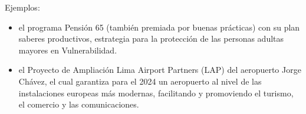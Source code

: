 \documentclass[
  a4paper,
]{article}
\providecommand{\tightlist}{%
  \setlength{\itemsep}{0pt}\setlength{\parskip}{0pt}}\usepackage{longtable,booktabs,array}
\begin{document}
Ejemplos:

\begin{itemize}
\tightlist
\item
  el programa Pensión 65 (también premiada por buenas prácticas) con su
  plan saberes productivos, estrategia para la protección de las
  personas adultas mayores en Vulnerabilidad.
\item
  el Proyecto de Ampliación Lima Airport Partners (LAP) del aeropuerto
  Jorge Chávez, el cual garantiza para el 2024 un aeropuerto al nivel de
  las instalaciones europeas más modernas, facilitando y promoviendo el
  turismo, el comercio y las comunicaciones.
\end{itemize}


\printbibliography
\end{document}
